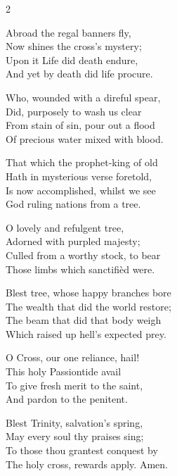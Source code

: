 \begin{multicols}{2}
\raggedcolumns
\begin{enpars}
Abroad the regal banners fly,\\
Now shines the cross’s mystery;\\
Upon it Life did death endure,\\
And yet by death did life procure.

Who, wounded with a direful spear,\\
Did, purposely to wash us clear\\
From stain of sin, pour out a flood\\
Of precious water mixed with blood.

That which the prophet-king of old\\
Hath in mysterious verse foretold,\\
Is now accomplished, whilst we see\\
God ruling nations from a tree.

O lovely and refulgent tree,\\
Adorned with purpled majesty;\\
Culled from a worthy stock, to bear\\
Those limbs which sanctifièd were.

Blest tree, whose happy branches bore\\
The wealth that did the world restore;\\
The beam that did that body weigh\\
Which raised up hell’s expected prey.

O Cross, our one reliance, hail!\\
This holy Passiontide avail\\
To give fresh merit to the saint,\\
And pardon to the penitent.

Blest Trinity, salvation’s spring,\\
May every soul thy praises sing;\\
To those thou grantest conquest by\\
The holy cross, rewards apply. Amen.
\end{enpars}\end{multicols}